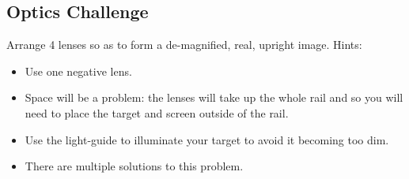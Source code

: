 \documentclass[a4paper]{report}
\begin{document}
%
%
%


\clearpage
\subsection{Optics Challenge}
Arrange 4 lenses so as to form a de-magnified, real, upright
image. Hints: 
\begin{itemize}
\item Use one negative lens.
\item Space will be a problem: the lenses will take up the whole rail
  and so you will need to place the target and screen outside of the
  rail. 
\item Use the light-guide to illuminate your target to avoid it
  becoming too dim. 
\item There are multiple solutions to this problem.
\end{itemize}
\end{document}
